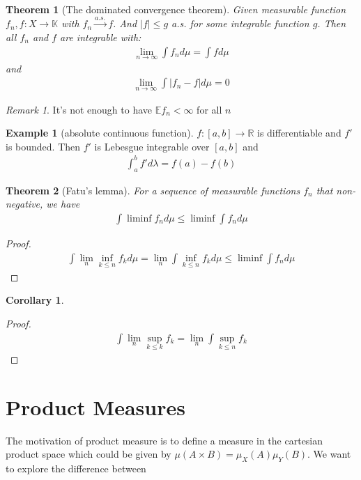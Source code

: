 \documentclass[a4paper,11pt,oneside,fleqn]{book}
\newtheorem{theorem}{Theorem}[section]
\newtheorem{corollary}{Corollary}[theorem]
\theoremstyle{definition}
\newtheorem*{example}{Example}
\theoremstyle{remark}
\newtheorem*{remark}{Remark}
\begin{document}
\begin{theorem}[The dominated convergence theorem]
	Given measurable function $f_n, f : X \rightarrow \mathbb{K}$ with $f_n \overset{a.s.}{\rightarrow} f$. And $|f| \leq g$ a.s.  for some integrable function $g$. Then all $f_n$ and $f$ are integrable with:
	\begin{align*}
		\lim_{n \rightarrow \infty} \int f_n d\mu = \int f d\mu
	\end{align*}
	and 
	\begin{align*}
		\lim_{n \rightarrow \infty} \int |f_n - f| d\mu = 0
	\end{align*}
\end{theorem}
\begin{remark}
It's not enough to have $\mathbb{E}f_n < \infty$ for all $n$	
\end{remark}

\begin{example}[absolute continuous function]
	$f:[a, b] \rightarrow \mathbb{R}$ is differentiable and $f'$ is bounded. Then $f'$ is Lebesgue integrable over $[a, b]$ and 
	\begin{align*}
		\int_a^b f'd\lambda = f(a) - f(b)
	\end{align*}
\end{example}

\begin{theorem}[Fatu's lemma]
	For a sequence of measurable functions $f_n$ that non-negative, we have
	\begin{align*}
		\int \liminf f_n d\mu \le \liminf \int f_n d\mu 
	\end{align*}
\end{theorem}
\begin{proof}
\begin{align*}
	\int \lim_n \inf_{k \le n} f_k d\mu = \lim_n \int \inf_{k \le n} f_k d\mu \le \liminf \int f_n d\mu 
\end{align*}
\end{proof}

\begin{corollary}
	
\end{corollary}
\begin{proof}
\begin{align*}
	\int \lim_n \sup_{k \le k} f_k  = \lim_n \int \sup_{k \le n}f_k 
\end{align*}
\end{proof}



\newpage
\section{Product Measures}
The motivation of product measure is to define a measure in the cartesian product space which could be given by $\mu(A \times B) = \mu_X(A) \mu_Y(B)$. We want to explore the difference between 
\end{document}
